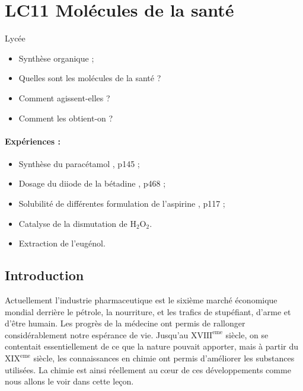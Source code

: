 \section{LC11 Molécules de la santé}

\niveau Lycée

\prerequis
\begin{itemize}
\item Synthèse organique ;
\end{itemize}

\objectif
\begin{itemize}
\item Quelles sont les molécules de la santé ?
\item Comment agissent-elles ?
\item Comment les obtient-on ? 
\end{itemize}

\footnotesize{}

\paragraph{Expériences :}
\begin{itemize}
\item Synthèse du paracétamol \cite{Mesplede2002}, p145 ;
\item Dosage du diiode de la bétadine \cite{Dulaurans2012}, p468 ;
\item Solubilité de différentes formulation de l'aspirine \cite{Bataille2010}, p117 ;
\item Catalyse de la dismutation de $\mathrm{H_2O_2}$.
\item Extraction de l'eugénol.
\end{itemize}

\subsection{Introduction}

Actuellement l'industrie pharmaceutique est le sixième marché économique mondial derrière le pétrole, la nourriture, et les trafics de stupéfiant, d'arme et d'être humain.
Les progrès de la médecine ont permis de rallonger considérablement notre espérance de vie.
Jusqu'au $\mathrm{XVIII^{eme}}$ siècle, on se contentait essentiellement de ce que la nature pouvait apporter, mais à partir du $\mathrm{XIX^{eme}}$ siècle, les connaissances en chimie ont permis d'améliorer les substances utilisées.
La chimie est ainsi réellement au cœur de ces développements comme nous allons le voir dans cette leçon.

